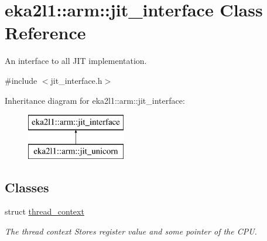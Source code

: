 \hypertarget{classeka2l1_1_1arm_1_1jit__interface}{}\section{eka2l1\+:\+:arm\+:\+:jit\+\_\+interface Class Reference}
\label{classeka2l1_1_1arm_1_1jit__interface}


An interface to all J\+IT implementation.  




{\ttfamily \#include $<$jit\+\_\+interface.\+h$>$}

Inheritance diagram for eka2l1\+:\+:arm\+:\+:jit\+\_\+interface\+:\begin{figure}[H]
\begin{center}
\leavevmode
\includegraphics[height=2.000000cm]{classeka2l1_1_1arm_1_1jit__interface}
\end{center}
\end{figure}
\subsection*{Classes}
\begin{DoxyCompactItemize}
\item 
struct \mbox{\hyperlink{structeka2l1_1_1arm_1_1jit__interface_1_1thread__context}{thread\+\_\+context}}
\begin{DoxyCompactList}\small\item\em The thread context Stores register value and some pointer of the C\+PU. \end{DoxyCompactList}\end{DoxyCompactItemize}
